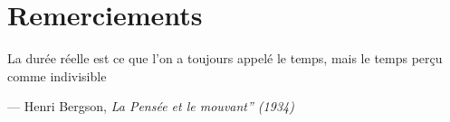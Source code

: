 \cleardoublepage



\chapter*{Remerciements}

\noindent \lipsum[2-4]


\medskip

\noindent \lipsum[2-4]


\medskip

\noindent \lipsum[2-4]


\vfill


\epigraph{La durée réelle est ce que l'on a toujours appelé le temps, mais le temps perçu comme indivisible}{--- Henri Bergson, \textit{La Pensée et le mouvant” (1934)}}
